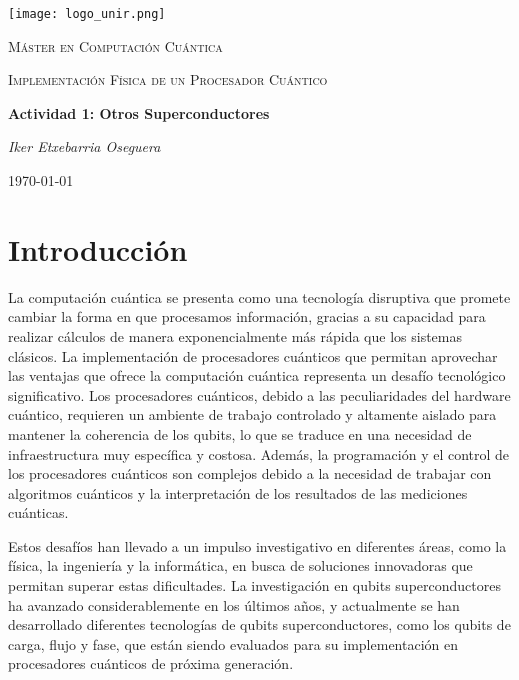 \documentclass[12pt]{article}
\begin{document}
\begin{titlepage}
    \centering
    \texttt{[image: logo\_unir.png]}\par\vspace{1cm}
    \vspace{1cm}
    {\scshape\Large Máster en Computación Cuántica\par}    
    \vspace{1cm}
    {\scshape\Large Implementación Física de un Procesador Cuántico\par}
    \vspace{3cm}
    {\Huge\bfseries Actividad 1: Otros Superconductores\par}
    \vspace{1.5cm}
    {\Large\itshape Iker Etxebarria Oseguera\par}
    \vfill
    {\large \today\par}
\end{titlepage}

\newpage

\section{Introducción}

La computación cuántica se presenta como una tecnología disruptiva que promete cambiar la forma en que procesamos información, gracias a su capacidad para realizar cálculos de manera exponencialmente más rápida que los sistemas clásicos. La implementación de procesadores cuánticos que permitan aprovechar las ventajas que ofrece la computación cuántica representa un desafío tecnológico significativo. Los procesadores cuánticos, debido a las peculiaridades del hardware cuántico, requieren un ambiente de trabajo controlado y altamente aislado para mantener la coherencia de los qubits, lo que se traduce en una necesidad de infraestructura muy específica y costosa. Además, la programación y el control de los procesadores cuánticos son complejos debido a la necesidad de trabajar con algoritmos cuánticos y la interpretación de los resultados de las mediciones cuánticas.

Estos desafíos han llevado a un impulso investigativo en diferentes áreas, como la física, la ingeniería y la informática, en busca de soluciones innovadoras que permitan superar estas dificultades. La investigación en qubits superconductores ha avanzado considerablemente en los últimos años, y actualmente se han desarrollado diferentes tecnologías de qubits superconductores, como los qubits de carga, flujo y fase, que están siendo evaluados para su implementación en procesadores cuánticos de próxima generación.
\end{document}
